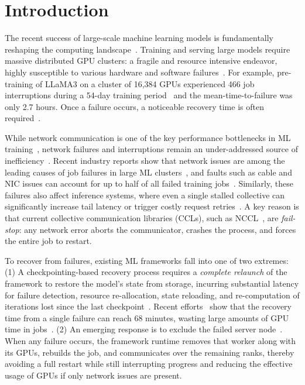\section{Introduction}

The recent success of large-scale machine learning models is fundamentally reshaping the computing landscape~\cite{hu2024characterization, choudhury2024mast, gangidi2024rdma, qian2024alibaba}. Training and serving large models require massive distributed GPU clusters: a fragile and resource intensive endeavor, highly susceptible to various hardware and software failures~\cite{megascale, gandhi2024recycle}. For example, pre-training of LLaMA3 on a cluster of 16,384 GPUs experienced 466 job interruptions during a 54-day training period~\cite{llama3} and the mean-time-to-failure was only 2.7 hours. Once a failure occurs, a noticeable recovery time is often required~\cite{unicron,megascale}.

While network communication is one of the key performance bottlenecks in ML training~\cite{Megascalemoe,zhou2025accelerating,wang2023zeroplusplus,song2023optimus}, network failures and interruptions remain an under-addressed source of inefficiency~\cite{wang2024towards, yu2023understanding, Revisiting_Reliability}.
Recent industry reports show that network issues are among the leading causes of job failures in large ML clusters~\cite{llama3, Revisiting_Reliability, liu2024hostmesh, wan2025robust}, and faults such as cable and NIC issues can account for up to half of all failed training jobs~\cite{unicron}. Similarly, these failures also affect inference systems, where even a single stalled collective can significantly increase tail latency or trigger costly request retries~\cite{ICML2024}. A key reason is that current collective communication libraries (CCLs), such as NCCL~\cite{NCCL}, are {\em fail-stop}: any network error aborts the communicator, crashes the process, and forces the entire job to restart.

To recover from failures, existing ML frameworks fall into one of two extremes: (1) A checkpointing-based recovery process requires a \textit{complete relaunch} of the framework to restore the model's state from storage, incurring substantial latency for failure detection, resource re-allocation, state reloading, and re-computation of iterations lost since the last checkpoint~\cite{bytecheckpoint,eisenman2022check,gupta2024just,mohan2021checkfreq,wang2023gemini}. Recent efforts~\cite{unicron,megascale} show that the recovery time from a single failure can reach 68 minutes, wasting large amounts of GPU time in jobs~\cite{wang2023gemini}. (2) An emerging response is to exclude the failed server node~\cite{oobleck,gandhi2024recycle}. When any failure occurs, the framework runtime removes that worker along with its GPUs, rebuilds the job, and communicates over the remaining ranks, thereby avoiding a full restart while still interrupting progress and reducing the effective usage of GPUs if only network issues are present.

